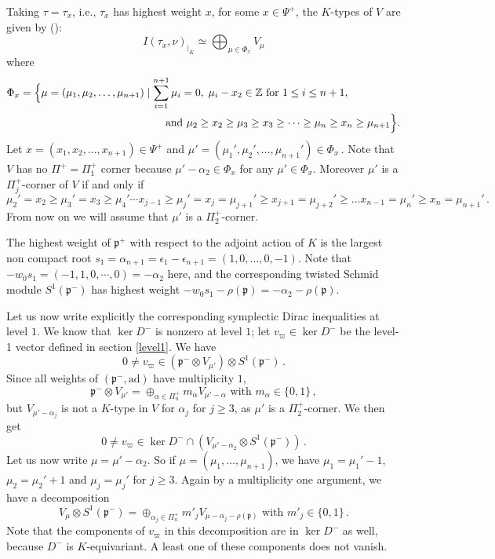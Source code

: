 \documentclass{amsart}[draft,11pt]
\newcommand{\fp}{{\mathfrak{p}}}
\numberwithin{equation}{section}
\theoremstyle{definition}
\begin{document}
Taking $\tau=\tau_x$, i.e., $\tau_x$ has highest weight $x$, for some $x\in\Psi^+$, the $K$-types of $V$ are given by (\cite[Theorem 1]{Se}):
\[
I(\tau_x,\nu)_{\mid_{K}}\simeq\bigoplus_{\mu\in\Phi_x}V_\mu
\]
where 
\begin{align*}
\Phi_x&=
\Bigl\{
\mu=(\mu_1,\mu_2,\ldots,\mu_{n+1})\mid\sum_{i=1}^{n+1} \mu_i=0,\;\mu_i-x_2\in{\mathbb Z}\text{ for }1\leq i\leq n+1,
\\& 
\phantom{=
\Bigl\{
\mu=(\mu_1,\mu_2,\ldots,\mu_{n+1})\mid\sum}
\text{and } \mu_2\geq x_2\geq\mu_3\geq x_3\geq\cdots\geq\mu_{n}\geq x_{n}\geq\mu_{n+1} \Bigr\}.
\end{align*}
Let
$
x=\left(x_1,x_2,\ldots,x_{n+1}\right)\in\Psi^+
$
and 
$
\mu'=\left(\mu_1',\mu_2',\ldots,\mu_{n+1}'\right)\in\Phi_x\,.
$
Note that $V$ has no $\Pi^+=\Pi_1^+$ corner because
$\mu'-\alpha_2 \in \Phi_x$ for any $\mu'\in\Phi_x$.
Moreover
$\mu'$ is a $\Pi^+_j$-corner of $V$
if and only if
$$
\mu_2'= x_2\geq\mu_3'= x_3\geq\mu_4'\cdots
x_{j-1}\geq\mu_j'=x_j=\mu_{j+1}'\geq x_{j+1}=\mu_{j+2}'
\geq \ldots x_{n-1}=\mu_{n}'\geq  x_{n}=\mu_{n+1}'\,.
$$
From now on we will assume that $\mu'$ is a $\Pi^+_2$-corner.

The highest weight of $\mathfrak{p}^+$ 
with respect to the adjoint action of $K$
is the largest non compact root 
$s_1=\alpha_{n+1}=\epsilon_1-\epsilon_{n+1}=(1,0,\ldots,0,-1)$. Note that $-w_0s_1=(-1,1,0,\cdots,0)=-\alpha_2$ here, and the corresponding twisted Schmid module $S^1(\fp^-)$ has highest weight $-w_0s_1-\rho(\fp)=-\alpha_2-\rho(\fp)$.

Let us now write explicitly the corresponding symplectic Dirac inequalities at level $1$. We know that $\ker D^-$ is nonzero at level $1$; let $v_\varpi\in\ker D^-$ be the level-1 vector defined in section \ref{level1}.
We have
$$
0\neq v_\varpi \in (\fp^-\otimes V_{\mu'})\otimes S^1(\fp^-) \,.
$$
Since all weights of $(\fp^-,\text{ad})$ have multiplicity $1$, 
$$\fp^-\otimes V_{\mu'}=
\oplus_{\alpha\in\Pi_n^+} m_\alpha V_{\mu'-\alpha}
\text{ with } m_\alpha\in\{0,1\}\,,$$
but $V_{\mu'-\alpha_j}$ is not a $K$-type in $V$ for 
$\alpha_j$ for $j\geq 3$,
as $\mu'$ is a $\Pi^+_2$-corner. We then get
$$0\neq v_\varpi \in \ker D^-\cap (V_{\mu'-\alpha_2}\otimes S^1(\fp^-))\,.$$
Let us now write $\mu=\mu'-\alpha_2$.
So if $\mu=(\mu_1,\ldots,\mu_{n+1})$, we 
have $\mu_1=\mu_1'-1$, $\mu_2=\mu_2'+1$
and $\mu_j=\mu_j'$ for $j\geq 3$.
Again by a multiplicity one argument, we have a decomposition
\begin{equation}\label{mjtens}
V_{\mu}\otimes S^1(\fp^-)=
\oplus_{\alpha_j\in\Pi_n^+}m'_j V_{\mu-\alpha_j-\rho(\fp)}
\text{ with } m'_j\in\{0,1\}\,.
\end{equation}
Note that the components of $v_\varpi$ in this decomposition are in $\ker D^-$ as well, because $D^-$
is $K$-equivariant. A least one of these components does not vanish. 
\end{document}
